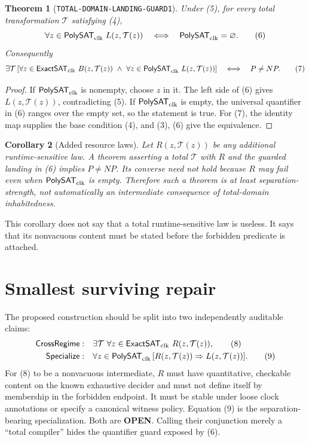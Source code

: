 \documentclass[11pt]{article}
\newtheorem{theorem}{Theorem}
\newtheorem{corollary}[theorem]{Corollary}
\newcommand{\ExactSAT}{\mathsf{ExactSAT}_{\rm clk}}
\newcommand{\PolySAT}{\mathsf{PolySAT}_{\rm clk}}
\newcommand{\OPEN}{\textbf{OPEN}}
\begin{document}
\begin{theorem}[\texttt{TOTAL-DOMAIN-LANDING-GUARD1}]
Under (5), for every total transformation $\mathcal T$ satisfying (4),
\[
 \forall z\in\PolySAT\ L(z,\mathcal T(z))
 \quad\Longleftrightarrow\quad
 \PolySAT=\varnothing. \tag{6}
\]
Consequently
\[
 \exists\mathcal T\,[\forall z\in\ExactSAT\ B(z,\mathcal T(z))\ \land\
 \forall z\in\PolySAT\ L(z,\mathcal T(z))]
 \quad\Longleftrightarrow\quad P\ne NP. \tag{7}
\]
\end{theorem}
\begin{proof}
If $\PolySAT$ is nonempty, choose $z$ in it.  The left side of (6) gives
$L(z,\mathcal T(z))$, contradicting (5).  If $\PolySAT$ is empty, the
universal quantifier in (6) ranges over the empty set, so the statement is
true.  For (7), the identity map supplies the base condition (4), and (3),
(6) give the equivalence.
\end{proof}

\begin{corollary}[Added resource laws]
Let $R(z,\mathcal T(z))$ be any additional runtime-sensitive law.  A theorem
asserting a total $\mathcal T$ with $R$ and the guarded landing in (6) implies
$P\ne NP$.  Its converse need not hold because $R$ may fail even when
$\PolySAT$ is empty.  Therefore such a theorem is at least
separation-strength, not automatically an intermediate consequence of
total-domain inhabitedness.
\end{corollary}

This corollary does not say that a total runtime-sensitive law is useless.
It says that its nonvacuous content must be stated before the forbidden
predicate is attached.

\section{Smallest surviving repair}
The proposed construction should be split into two independently auditable
claims:
\begin{align*}
\textsf{CrossRegime}:\quad &
 \exists\mathcal T\ \forall z\in\ExactSAT\ R(z,\mathcal T(z)), \tag{8}\\
\textsf{Specialize}:\quad &
 \forall z\in\PolySAT\,[R(z,\mathcal T(z))\Rightarrow
 L(z,\mathcal T(z))]. \tag{9}
\end{align*}
For (8) to be a nonvacuous intermediate, $R$ must have quantitative,
checkable content on the known exhaustive decider and must not define itself
by membership in the forbidden endpoint.  It must be stable under loose
clock annotations or specify a canonical witness policy.  Equation (9) is
the separation-bearing specialization.  Both are \OPEN.  Calling their
conjunction merely a ``total compiler'' hides the quantifier guard exposed
by (6).
\end{document}
